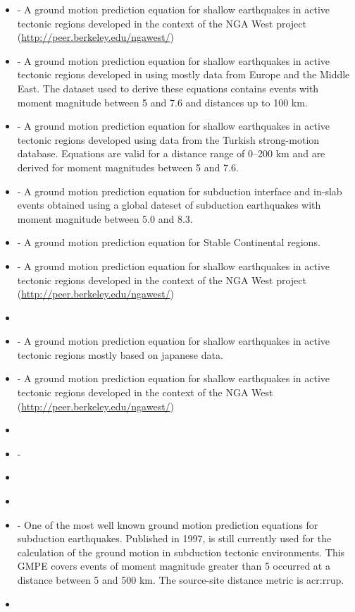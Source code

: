 \begin{itemize} 
    \item \cite{abrahamson2008} - A ground motion prediction equation 
    for shallow earthquakes in active tectonic regions developed in 
    the context of the NGA West project
    (\href{http://peer.berkeley.edu/ngawest/}{http://peer.berkeley.edu/ngawest/})
    \item \cite{akkar2010} - A ground motion prediction equation 
    for shallow earthquakes in active tectonic regions developed in 
    using mostly data from Europe and the Middle East. The dataset 
    used to derive these equations contains events with moment 
    magnitude between 5 and 7.6 and distances up to 100 km.
    \item \cite{akkar2010a} - A ground motion prediction equation for shallow
    earthquakes in active tectonic regions developed using data from the 
    Turkish strong-motion database. Equations are valid for a distance 
    range of 0–200 km and are derived for moment magnitudes 
    between 5 and 7.6.
    \item \cite{atkinson2003} - A ground motion prediction equation for 
    subduction interface and in-slab events obtained using a global 
    dateset of subduction earthquakes with moment magnitude between 
    5.0 and 8.3.
    \item \cite{atkinson2006} - A ground motion prediction equation for 
    Stable Continental regions.
    \item \cite{boore2008} - A ground motion prediction equation 
    for shallow earthquakes in active tectonic regions developed in 
    the context of the NGA West project 
    	(\href{http://peer.berkeley.edu/ngawest/}
		{http://peer.berkeley.edu/ngawest/})
    \item \cite{campbell2003}
    \item \cite{cauzzi2008} - A ground motion prediction equation 
    	for shallow earthquakes in active tectonic regions mostly based 
    	on japanese data.
    \item \cite{chiou2008} - A ground motion prediction equation 
    	for shallow earthquakes in active tectonic regions developed in 
    	the context of the NGA West
    	(\href{http://peer.berkeley.edu/ngawest/}
		{http://peer.berkeley.edu/ngawest/})
    \item \cite{faccioli2010}
    \item \cite{lin2008} - 
    \item \cite{sadigh1997}
    \item \cite{toro2002}
    \item \cite{youngs1997} - One of the most well known ground motion 
		prediction equations for subduction earthquakes. Published in 1997,
		is still currently used for the calculation of the ground motion 
		in subduction tectonic environments. This GMPE covers events of 
		moment magnitude greater than 5 occurred at a distance between 5
		and 500 km. The source-site distance metric is \gls{acr:rrup}.
    \item \cite{zhao2006} 
\end{itemize}
